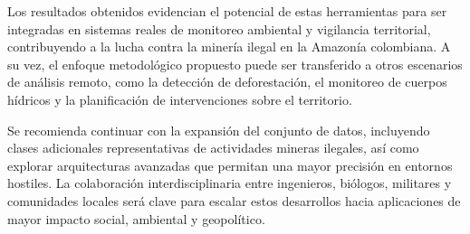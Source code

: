 Los resultados obtenidos evidencian el potencial de estas herramientas para ser integradas en sistemas reales de monitoreo ambiental y vigilancia territorial, contribuyendo a la lucha contra la minería ilegal en la Amazonía colombiana. A su vez, el enfoque metodológico propuesto puede ser transferido a otros escenarios de análisis remoto, como la detección de deforestación, el monitoreo de cuerpos hídricos y la planificación de intervenciones sobre el territorio.

Se recomienda continuar con la expansión del conjunto de datos, incluyendo clases adicionales representativas de actividades mineras ilegales, así como explorar arquitecturas avanzadas que permitan una mayor precisión en entornos hostiles. La colaboración interdisciplinaria entre ingenieros, biólogos, militares y comunidades locales será clave para escalar estos desarrollos hacia aplicaciones de mayor impacto social, ambiental y geopolítico.

